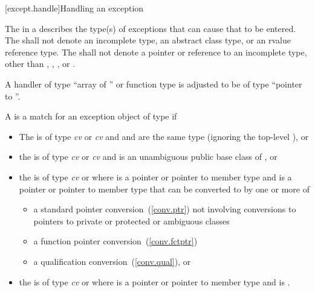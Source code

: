[except.handle]{Handling an exception}
%

\pnum
The
in a
describes the type(s) of exceptions that can cause
that
to be entered.
%
%
%
%
The
shall not denote an incomplete type, an abstract class type, or an rvalue reference type.
The
shall not denote a pointer or reference to an
incomplete type, other than
,
,
,
or
.

\pnum
A handler of type
%
``array of '' or
%
function type 
is adjusted to be of type
``pointer to ''.

\pnum
{}%
A
is a match for
an exception object
of type
if
\begin{itemize}
\item%
The  is of type \textit{cv}  or
\textit{cv}  and
 and 
are the same type (ignoring the top-level ), or
\item%
the  is of type \textit{cv}  or
\textit{cv}  and
 is an unambiguous public base class of , or
\item%
the  is of type \textit{cv}  or 
where  is a pointer or pointer to member type and
 is a pointer or pointer to member type
that can be converted to  by one or more of
\begin{itemize}

\item%
a standard pointer conversion~(\ref{conv.ptr}) not involving conversions
to pointers to private or protected or ambiguous classes
\item%
a function pointer conversion~(\ref{conv.fctptr})
\item%
a qualification conversion~(\ref{conv.qual}), or

\end{itemize}

\item
the  is of type \textit{cv}  or  where  is a pointer or pointer to member type and  is .

\end{itemize}

